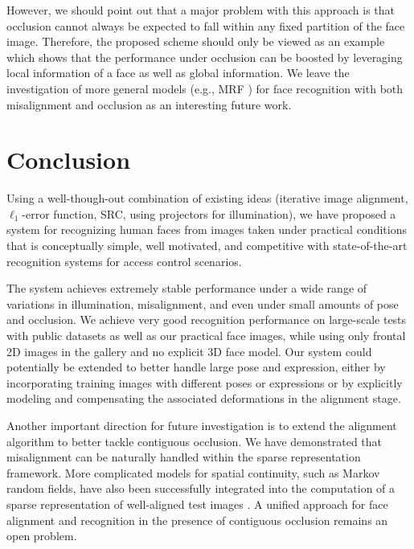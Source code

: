 However, we should point out that a major problem with this
approach is that occlusion cannot always be expected to fall within
 any fixed partition of the face image. Therefore, the
proposed scheme should only be viewed as an example which shows
that the performance under occlusion can be boosted by
leveraging local information of a face as well as global information. We
leave the investigation of more general models (e.g., MRF \cite{ZhouZ2009}) for face
recognition with both misalignment and occlusion as an
interesting future work.

\section{Conclusion}\label{sec:conclusion}
Using a well-though-out combination of existing ideas
(iterative image alignment, $\ell_1$-error function, SRC, using projectors for
illumination), we have proposed a system for recognizing human faces
from images taken under practical conditions that is conceptually simple, well
motivated, and competitive with state-of-the-art recognition systems for access
control scenarios.

The system achieves extremely stable performance under
a wide range of variations in illumination, misalignment, and even under small amounts of
pose and occlusion. We achieve very good recognition performance on
large-scale tests with public datasets as well as our practical face
images, while using only frontal 2D images in the gallery and no
explicit 3D face model.
Our system could potentially be extended to better handle large pose
and expression, either by incorporating training images with different poses or
expressions or by explicitly modeling and compensating the associated deformations
in the alignment stage.

Another important direction for future
investigation is to extend the alignment algorithm to better
tackle contiguous occlusion. We have demonstrated that misalignment can be naturally handled within the
sparse representation framework. More complicated models for
spatial continuity, such as Markov random fields, have also
been successfully integrated into the computation of a sparse
representation of well-aligned test images
\cite{Cevher2008-NIPS, ZhouZ2009}. A unified approach
for face alignment and recognition in the presence of
contiguous occlusion remains an open problem.

